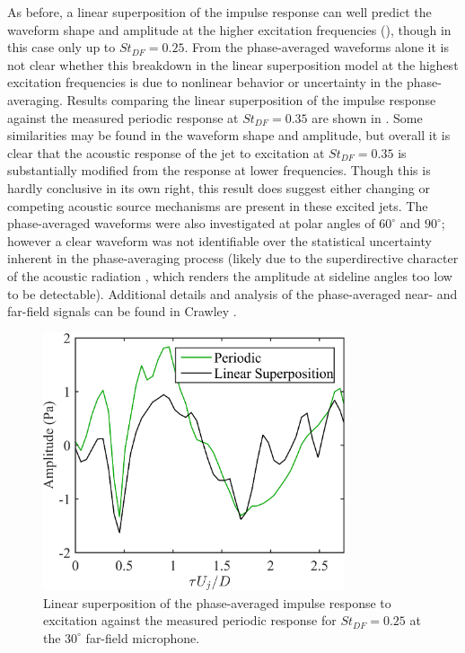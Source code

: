 As before, a linear superposition of the impulse response can well predict the waveform shape and amplitude at the higher excitation frequencies (), though in this case only up to $St_{DF}  = 0.25$. 
From the phase-averaged waveforms alone it is not clear whether this breakdown in the linear superposition model at the highest excitation frequencies is due to nonlinear behavior or uncertainty in the phase-averaging. 
Results comparing the linear superposition of the impulse response against the measured periodic response at $St_{DF}  = 0.35$ are shown in .
Some similarities may be found in the waveform shape and amplitude, but overall it is clear that the acoustic response of the jet to excitation at $St_{DF}  = 0.35$ is substantially modified from the response at lower frequencies.
Though this is hardly conclusive in its own right, this result does suggest either changing or competing acoustic source mechanisms are present in these excited jets.
The phase-averaged waveforms were also investigated at polar angles of $60^\circ$ and $90^\circ$; however a clear waveform was not identifiable over the statistical uncertainty inherent in the phase-averaging process (likely due to the superdirective character of the acoustic radiation \citep{Crighton1990}, which renders the amplitude at sideline angles too low to be detectable).
Additional details and analysis of the phase-averaged near- and far-field signals can be found in Crawley \etal \citep{Crawley2015}.
\begin{figure}
	\centering
	\includegraphics[width=3.5in]{Figures/ch3_farfield_linearsuperposition_st035.png}
	\caption{Linear superposition of the phase-averaged impulse response to excitation against the measured periodic response for $St_{DF} = 0.25$ at the  $30^\circ$ far-field microphone.}
	\label{fig:ch3_farfield_nonlinear}
\end{figure}

